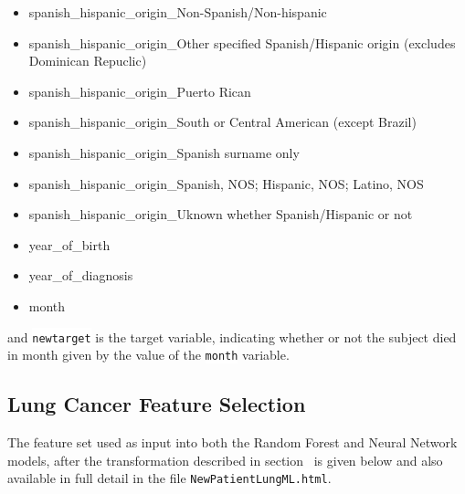 \documentclass[10pt,letterpaper]{article}
\newcommand{\codewhite}[1]{\colorbox{white}{\texttt{#1}}}
\begin{document}
\begin{itemize}[noitemsep]
\item spanish\_hispanic\_origin\_Non-Spanish/Non-hispanic
\item spanish\_hispanic\_origin\_Other specified Spanish/Hispanic origin (excludes Dominican Repuclic)
\item spanish\_hispanic\_origin\_Puerto Rican
\item spanish\_hispanic\_origin\_South or Central American (except Brazil)
\item spanish\_hispanic\_origin\_Spanish surname only
\item spanish\_hispanic\_origin\_Spanish, NOS; Hispanic, NOS; Latino, NOS
\item spanish\_hispanic\_origin\_Uknown whether Spanish/Hispanic or not
\item year\_of\_birth
\item year\_of\_diagnosis
\item month
\end{itemize}

and 
\codewhite{newtarget} is the target variable, indicating whether or not the subject died in month given by the value of the \codewhite{month} variable.




\subsection*{Lung Cancer Feature Selection}
\label{Lung_Cancer_Feature_Selection}

The feature set used as input into both the Random Forest and Neural Network models, after the transformation described in section~ is given below and also available in full detail in the file 
\codewhite{NewPatientLungML.html}.
\end{document}
